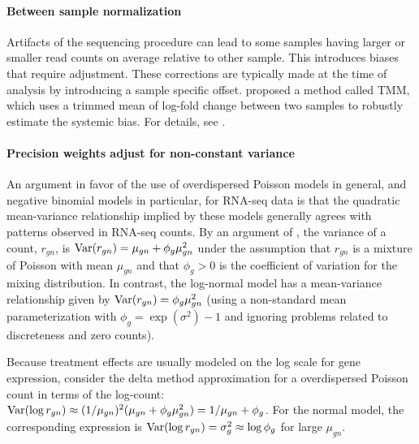 \paragraph{Between sample normalization}
Artifacts of the sequencing procedure can lead to some samples having larger or smaller read counts on average relative to other sample. This introduces biases that require adjustment. These corrections are typically made at the time of analysis by introducing a sample specific offset. \citet{robinson2010} proposed a method called TMM, which uses a trimmed mean of log-fold change between two samples to robustly estimate the systemic bias. For details, see \citet{robinson2010}.

\paragraph{Precision weights adjust for non-constant variance}
An argument in favor of the use of overdispersed Poisson models in general, and negative binomial models in particular, for RNA-seq data is that the quadratic mean-variance relationship implied by these models generally agrees with patterns observed in RNA-seq counts.  By an argument of \citet{mccarthy}, the variance of a count, $r_{gn}$, is $\operatorname{Var}(r_{gn})=\mu_{gn} + \phi_g \mu_{gn}^2$ under the assumption that $r_{gn}$ is a mixture of Poisson with mean $\mu_{gn}$ and that $\phi_g>0$ is the coefficient of variation for the mixing distribution. In contrast, the log-normal model has a mean-variance relationship given by $\operatorname{Var}(r_{gn})=\phi_g \mu_{gn}^2$ (using a non-standard mean parameterization with $\phi_g=\exp(\sigma^2)-1$ and ignoring problems related to discreteness and zero counts).


Because treatment effects are usually modeled on the log scale for gene expression, consider the delta method  approximation for a overdispersed Poisson count in terms of the log-count: $\operatorname{Var}(\log r_{gn}) \approx (1/\mu_{gn})^2(\mu_{gn} + \phi_g\mu_{gn}^2)=1/\mu_{gn} + \phi_g$. For the normal model, the corresponding expression is $\operatorname{Var}(\log r_{gn}) = \sigma^2_g\approx \log \phi_g$ for large $\mu_{gn}$.

